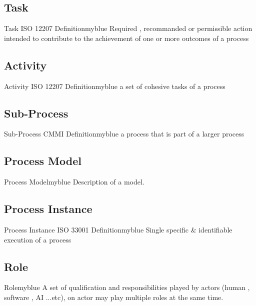 \documentclass{report}
\begin{document}
\vspace{0.15cm}
\subsection{Task}
\begin{prettyBox}{Task ISO 12207 Definition}{myblue}
    Required , recommanded or permissible action intended to contribute to the achievement of one 
    or more outcomes of a process
\end{prettyBox}

\vspace{0.15cm}
\subsection{Activity}
\begin{prettyBox}{Activity ISO 12207 Definition}{myblue}
    a set of cohesive tasks of a process
\end{prettyBox}

\vspace{0.15cm}
\subsection{Sub-Process}
\begin{prettyBox}{Sub-Process CMMI Definition}{myblue}
    a process that is part of a larger process
\end{prettyBox}

\vspace{0.15cm}
\subsection{Process Model}
\begin{prettyBox}{Process Model}{myblue}
    Description of a model.
\end{prettyBox}

\subsection{Process Instance}
\begin{prettyBox}{Process Instance ISO 33001 Definition}{myblue}
    Single specific \& identifiable execution of a process
\end{prettyBox}

\vspace{0.15cm}
\subsection{Role}
\begin{prettyBox}{Role}{myblue}
    A set of qualification and responsibilities played by actors (human , software , AI ...etc), on actor may
    play multiple roles at the same time.
\end{prettyBox}
\end{document}
